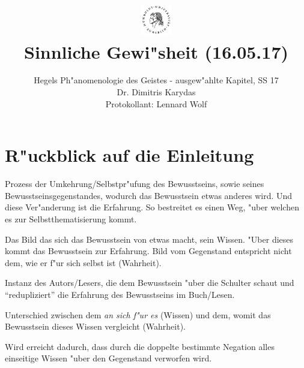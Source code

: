 \documentclass[a4paper, emulatestandardclasses]{scrartcl}
\date{\vspace{-3ex}}
\begin{document}
\title{
    \vspace{-30pt}
	\includegraphics*[width=0.1\textwidth,right]{ErstesSem/images/hu_logo2.png}\\
	\vspace{-10pt}
	Sinnliche Gewi"sheit (16.05.17)}%
	\subtitle{Hegels Ph"anomenologie des Geistes - ausgew"ahlte Kapitel, SS 17\\
          Dr. Dimitris Karydas\\
          Protokollant: Lennard Wolf}
\maketitle
\vspace{-30pt}

\section*{R"uckblick auf die Einleitung}
\begin{description}[leftmargin=!,labelwidth=\widthof{\bfseries Unterschied des Bewusstseins}]
  \item[Bewusstsein] Prozess der Umkehrung/Selbstpr"ufung des Bewusstseins, sowie seines Bewusstseinsgegenstandes, wodurch das Bewusstsein etwas anderes wird. Und diese Ver"anderung ist die Erfahrung. So bestreitet es einen Weg, "uber welchen es zur 	Selbstthematisierung kommt.
  \item[\emph{An sich f"ur es}] Das Bild das sich das Bewusstsein von etwas macht, sein Wissen. "Uber dieses kommt das Bewusstsein zur Erfahrung. Bild vom Gegenstand entspricht nicht dem, wie er f"ur sich selbst ist (Wahrheit).
  \item[Wir] Instanz des Autors/Lesers, die dem Bewusstsein "uber die Schulter schaut und "`redupliziert"' die Erfahrung des Bewusstseins im Buch/Lesen.
  \item[Unterschied des Bewusstseins] Unterschied zwischen dem \emph{an sich f"ur es} (Wissen) und dem, womit das Bewusstsein dieses Wissen vergleicht (Wahrheit).
  \item[Vollst"andigkeit der Form] Wird erreicht dadurch, dass durch die doppelte bestimmte Negation alles einseitige Wissen "uber den Gegenstand verworfen wird.
\end{description}
\end{document}
